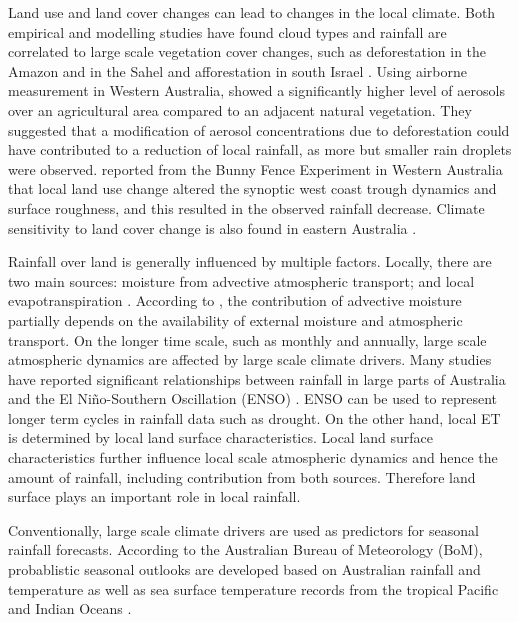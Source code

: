 \documentclass[draft,linenumbers]{agujournal}
\begin{document}
Land use and land cover changes can lead to changes in the local climate. Both empirical and modelling studies have found cloud types and rainfall are correlated to large scale vegetation cover changes, such as deforestation in the Amazon and in the Sahel \citep{Chagnon2005,Pinto2009, Wang2009, Mei2010, kucharski_further_2013,pitman_scale_2016} and afforestation in south Israel \citep{Otterman1990, Ben-Gai1998}. Using airborne measurement in Western Australia, \citet{Junkermann2009} showed a significantly higher level of aerosols over an agricultural area compared to an adjacent natural vegetation. They suggested that a modification of aerosol concentrations due to deforestation could have contributed to a reduction of local rainfall, as more but smaller rain droplets were observed. \citet{Nair2011} reported from the Bunny Fence Experiment in Western Australia that local land use change altered the synoptic west coast trough dynamics and surface roughness, and this resulted in the observed rainfall decrease. Climate sensitivity to land cover change is also found in eastern Australia \citep{McAlpine2007}. 

Rainfall over land is generally influenced by multiple factors. Locally, there are two main sources: moisture from advective atmospheric transport; and local evapotranspiration \citep{Eltahir1996,Bosilovich2006,Dirmeyer2009,Gimeno2010}. According to \citet{Trenberth1999}, the contribution of advective moisture partially depends on the availability of external moisture and atmospheric transport. On the longer time scale, such as monthly and annually, large scale atmospheric dynamics are affected by large scale climate drivers. Many studies have reported significant relationships between rainfall in large parts of Australia and the El Ni\~{n}o-Southern Oscillation (ENSO) \citep{Verdon2004,Risbey2009,Speer2011}. ENSO can be used to represent longer term cycles in rainfall data such as drought. On the other hand, local ET is determined by local land surface characteristics. Local land surface characteristics further influence local scale atmospheric dynamics and hence the amount of rainfall, including contribution from both sources. Therefore land surface plays an important role in local rainfall. 

Conventionally, large scale climate drivers are used as predictors for seasonal rainfall forecasts. According to the Australian Bureau of Meteorology (BoM), probablistic seasonal outlooks are developed based on Australian rainfall and temperature as well as sea surface temperature records from the tropical Pacific and Indian Oceans \citep{BoM2012c}. 
\end{document}
